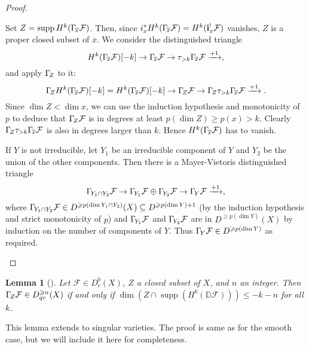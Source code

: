 \documentclass{compositio}
\theoremstyle{plain}
\newtheorem{Lem}[Thm]{Lemma}
\theoremstyle{definition}
\theoremstyle{remark}
\newcommand\sheaf{\mathcal}
\newcommand\supp{\operatorname{supp}}
\newcommand\dualize{\mathbb D}
\newcommand\lc[1]{\Gamma_{\mkern-3mu#1}}
\begin{document}
\begin{proof}
\begin{enumerate}
            Set $Z = \supp H^k(\lc {\overline x}\sheaf F)$.
            Then, since $i_x^* H^k(\lc {\overline x}\sheaf F) = H^k(\mathbf i_x^! \sheaf F)$ vanishes, $Z$ is a proper closed subset of $\overline x$.
            We consider the distinguished triangle
            \[
                H^k(\lc {\overline x}\sheaf F)[-k] \to 
                \lc {\overline x}\sheaf F \to 
                \tau _{>k}\lc {\overline x}\sheaf F \xrightarrow{+1},
            \]
            and apply $\lc Z$ to it:
            \[
                \lc Z H^k(\lc {\overline x}\sheaf F)[-k] =
                H^k(\lc {\overline x}\sheaf F)[-k] \to 
                \lc Z \sheaf F \to 
                \lc Z \tau _{>k}\lc {\overline x}\sheaf F \xrightarrow{+1}.
            \]
            Since $\dim Z < \dim x$, we can use the induction hypothesis and monotonicity of $p$ to deduce that $\lc Z \sheaf F$ is in degrees at least $p(\dim Z) \ge p(x) > k$.
            Clearly $\lc Z \tau _{>k}\lc {\overline x}\sheaf F$ is also in degrees larger than $k$.
            Hence $H^k(\lc {\overline x}\sheaf F)$ has to vanish.

            If $Y$ is not irreducible, let $Y_1$ be an irreducible component of $Y$ and $Y_2$ be the union of the other components.
            Then there is a Mayer-Vietoris distinguished triangle
            \[
                \lc {Y_1\cap Y_2} \sheaf F \to  \lc {Y_1} \sheaf F \oplus \lc{Y_2}\sheaf F \to  \lc{Y} \sheaf F \xrightarrow{+1},
            \]
            where $\lc {Y_1\cap Y_2} \sheaf F \in  D^{\ge p(\dim Y_1\cap Y_2)}(X) \subseteq D^{\ge p(\dim Y)+1}$ (by the induction hypothesis and strict monotonicity of $p$) and $\lc{Y_1} \sheaf F$ and $\lc{Y_2} \sheaf F$ are in $D^{\ge p(\dim Y)}(X)$ by induction on the number of components of $Y$.
            Thus $\lc Y \sheaf F \in  D^{\ge p(\dim Y)}$ as required.
            \qedhere
    \end{enumerate}
\end{proof}

\begin{Lem}[{\cite[Proposition~5.2]{Kashiwara:2004:tStructureOnHolonomicDModuleCoherentOModules}}]%
    \label{lem:supportAndLocalCohomology+}%
    Let $\sheaf F \in  D_c^b(X)$, $Z$ a closed subset of $X$, and $n$ an integer.
    Then $\lc Z\sheaf F \in  D_{qc}^{\geq n}(X)$ if and only if $\dim(Z\cap \supp(H^k(\dualize \sheaf F))) \le - k - n$ for all $k$.
\end{Lem}

This lemma extends \cite[Proposition~5.2]{Kashiwara:2004:tStructureOnHolonomicDModuleCoherentOModules} to singular varieties.
The proof is same as for the smooth case, but we will include it here for completeness.
\end{document}
